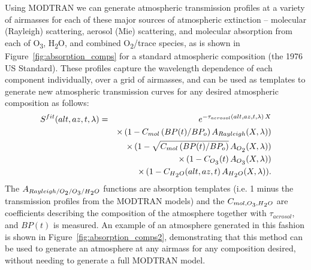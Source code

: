 \documentclass[12pt,preprint]{aastex}
\newcommand{\water}   {H\textsubscript{2}O}
\newcommand{\ozone}    {O\textsubscript{3}}
\newcommand{\oxy}     {O\textsubscript{2}}
\begin{document}
Using MODTRAN we can generate atmospheric transmission profiles at a
variety of airmasses for
each of these major sources of atmospheric extinction -- molecular
(Rayleigh) scattering, aerosol (Mie) scattering, and molecular
absorption from each of \ozone, \water, and combined \oxy/trace species, as is
shown in Figure~\ref{fig:absorption_comps} for a standard atmospheric
composition (the 1976 US Standard). These
profiles capture the wavelength dependence of each component
individually, over a grid of airmasses, and can be used as
templates to generate new atmospheric transmission curves for any
desired atmospheric composition as follows:
\begin{eqnarray}
S^{fit}(alt,az,t, \lambda) & = & \,e^{-\tau_{aerosol}(alt,az,t,\lambda)\,X} \nonumber \\
 & & \times \, (1 - C_{mol}\, (BP(t) / BP_o) \, A_{Rayleigh}(X, \lambda)) \nonumber \\
 & & \times \, (1 - \sqrt{ C_{mol}\, (BP(t) / BP_o)} \, A_{\oxy}(X, \lambda)) \nonumber \\
 & & \times \, (1 - C_{\ozone}(t) \, A_{\ozone}(X, \lambda)) \nonumber \\
 & & \times \, (1 - C_{\water}(alt,az,t)\,A_{\water}(X, \lambda)).
\label{eqn:atmo_fit}
\end{eqnarray}
The $A_{Rayleigh/\oxy/\ozone/\water}$ functions are
absorption templates (i.e. 1 minus the transmission profiles from the
MODTRAN models) and the $C_{mol,\ozone,\water}$ are
coefficients describing the composition of the atmosphere together
with $\tau_{aerosol}$, and $BP(t)$ is measured. An example of an
atmosphere generated in this fashion is shown in
Figure~\ref{fig:absorption_comps2}, demonstrating that this method can
be used to generate an atmosphere at any airmass for any composition
desired, without needing to generate a full MODTRAN model. 
\end{document}
